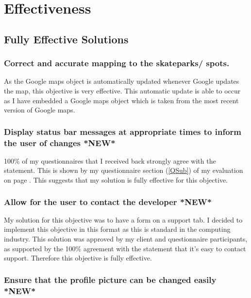 \section{Effectiveness} %

\subsection{Fully Effective Solutions}



	\subsubsection{Correct and accurate mapping to the skateparks/ spots.}

As the Google maps object is automatically updated whenever Google updates the map, this objective is very effective. This automatic update is able to occur as I have embedded a Google maps object which is taken from the most recent version of Google maps. 

	\subsubsection{Display status bar messages at appropriate times to inform the user of changes *NEW*}

100\% of my questionnaires that I received back strongly agree with the statement. This is shown by my questionnaire section (\ref{QSub}) of my evaluation on page \pageref{QSub}. This suggests that my solution is fully effective for this objective. 

	\subsubsection{Allow for the user to contact the developer *NEW*}

My solution for this objective was to have a form on a support tab. I decided to implement this objective in this format as this is standard in the computing industry. This solution was approved by my client and questionnaire participants, as supported by the 100\% agreement with the statement that it's easy to contact support. Therefore this objective is fully effective.

	\subsubsection{Ensure that the profile picture can be changed easily *NEW*}


